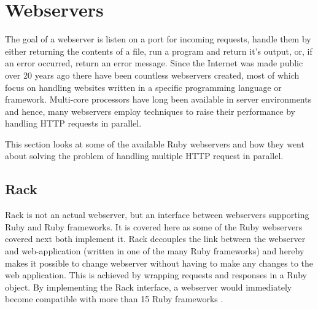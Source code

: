 \section{Webservers}
\label{webservers}

The goal of a webserver is listen on a port for incoming requests, handle them
by either returning the contents of a file, run a program and return it's
output, or, if an error occurred, return an error message. Since the Internet was
made public over 20 years ago there have been countless webservers created, most
of which focus on handling websites written in a specific programming language
or framework. Multi-core processors have long been available in server
environments and hence, many webservers employ techniques to raise their
performance by handling HTTP requests in parallel.


This section looks at some of the available Ruby webservers and how they went
about solving the problem of handling multiple HTTP request in parallel.


\subsection{Rack}
Rack is not an actual webserver, but an interface between webservers
supporting Ruby and Ruby frameworks. It is covered here as some of the Ruby
webservers covered next both implement it. Rack decouples the link between the
webserver and web-application (written in one of the many Ruby frameworks) and
hereby makes it possible to change webserver without having to make any
changes to the web application. This is achieved by wrapping requests and
responses in a Ruby object. By implementing the Rack interface, a webserver
would immediately become compatible with more than 15 Ruby frameworks
\cite{rackspec}.

